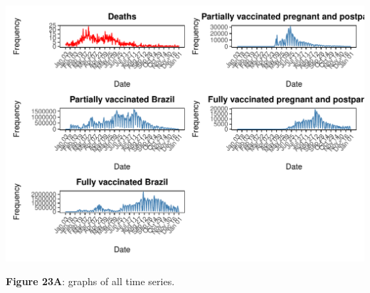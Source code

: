 \documentclass[
]{article}
\begin{document}
\begin{center}\includegraphics[width=\linewidth]{IF_results_ENG_files/figure-latex/unnamed-chunk-31-1} \end{center}

\textbf{Figure 23A}: graphs of all time series.
\end{document}
